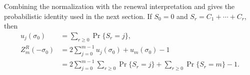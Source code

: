 Combining the normalization with the renewal interpretation and
 gives the probabilistic identity used
in the next section.
If \(S_0=0\) and \(S_r=C_1+\cdots+C_r\), then
\begin{equation}
\begin{aligned}
 u_j(\sigma_0)&=\sum_{r\ge0}\Pr\{S_r=j\},\\
 Z_m^R(-\sigma_0)
 &=2\sum_{j=0}^{m-1}u_j(\sigma_0)+u_m(\sigma_0)-1\\
 &=2\sum_{j=0}^{m-1}\sum_{r\ge0}\Pr\{S_r=j\}
  +\sum_{r\ge0}\Pr\{S_r=m\}-1.
\end{aligned}
 \label{eq:critical-weighted-renewal-identity}
\end{equation}
